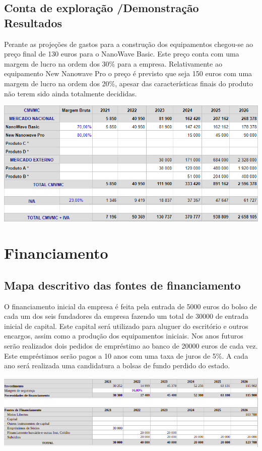 \documentclass[a4paper]{article}
\begin{document}
\subsection{Conta de exploração /Demonstração Resultados}
Perante as projeções de gastos para a construção dos equipamentos chegou-se ao preço final de 130 euros para o NanoWave Basic. Este preço conta com uma margem de lucro na ordem dos 30\% para a empresa. Relativamente ao equipamento New Nanowave Pro o preço é previsto que seja 150 euros com uma margem de lucro na ordem dos 20\%, apesar das características finais do produto não terem sido ainda totalmente decididas. 
\begin{center}
    \includegraphics[scale=0.7]{images/cmvmc.png}
\end{center}
\section{Financiamento}
\subsection{Mapa descritivo das fontes de financiamento}
O financiamento inicial da empresa é feita pela entrada de 5000 euros do bolso de cada um dos seis fundadores da empresa fazendo um total de 30000 de entrada inicial de capital. Este capital será utilizado para aluguer do escritório e outros encargos, assim como a produção dos equipamentos iniciais. Nos anos futuros serão realizados dois pedidos de empréstimo ao banco de 20000 euros de cada vez. Este empréstimos serão pagos a 10 anos com uma taxa de juros de 5\%. A cada ano será realizada uma candidatura a bolsas de fundo perdido do estado.
\begin{center}
    \includegraphics[scale=0.5]{images/financiamento.png}
\end{center}
\end{document}
